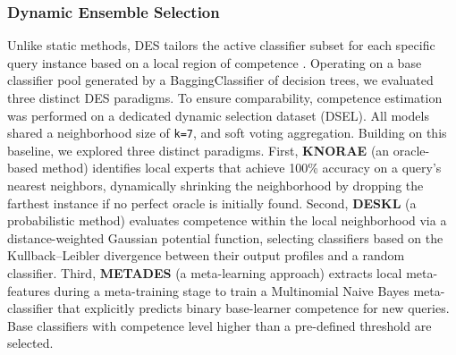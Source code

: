 \documentclass[conference]{IEEEtran}
\begin{document}
\subsubsection{Dynamic Ensemble Selection}

Unlike static methods, DES tailors the active classifier subset for each specific query instance based on a local region of competence \cite{CRUZ2018195}. Operating on a base classifier pool generated by a BaggingClassifier of decision trees, we evaluated three distinct DES paradigms. To ensure comparability, competence estimation was performed on a dedicated dynamic selection dataset (DSEL). All models shared a neighborhood size of \texttt{k=7}, and soft voting aggregation. Building on this baseline, we explored three distinct paradigms. First, \textbf{KNORAE} (an oracle-based method) identifies local experts that achieve 100\% accuracy on a query's nearest neighbors, dynamically shrinking the neighborhood by dropping the farthest instance if no perfect oracle is initially found. Second, \textbf{DESKL} (a probabilistic method) evaluates competence within the local neighborhood via a distance-weighted Gaussian potential function, selecting classifiers based on the Kullback--Leibler divergence between their output profiles and a random classifier. Third, \textbf{METADES} (a meta-learning approach) extracts local meta-features during a meta-training stage to train a Multinomial Naive Bayes meta-classifier that explicitly predicts binary base-learner competence for new queries. Base classifiers with competence level higher than a pre-defined threshold are selected. 
\end{document}
